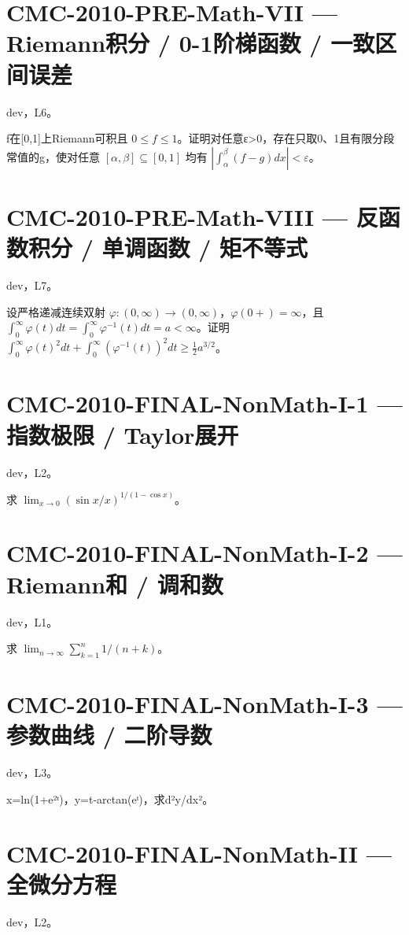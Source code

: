 \documentclass[UTF8]{ctexart}
\begin{document}
\section*{CMC-2010-PRE-Math-VII — Riemann积分 / 0-1阶梯函数 / 一致区间误差}

dev，L6。

f在[0,1]上Riemann可积且 $0\le f\le1$。证明对任意ε>0，存在只取0、1且有限分段常值的g，使对任意 $[\alpha,\beta]\subseteq[0,1]$ 均有 $|\int_\alpha^\beta(f-g)dx|<\varepsilon$。

\section*{CMC-2010-PRE-Math-VIII — 反函数积分 / 单调函数 / 矩不等式}

dev，L7。

设严格递减连续双射 $\varphi:(0,\infty)\to(0,\infty)$，$\varphi(0+)=\infty$，且 $\int_0^\infty\varphi(t)dt=\int_0^\infty\varphi^{-1}(t)dt=a<\infty$。证明 $\int_0^\infty\varphi(t)^2dt+\int_0^\infty(\varphi^{-1}(t))^2dt\ge\tfrac12a^{3/2}$。

\section*{CMC-2010-FINAL-NonMath-I-1 — 指数极限 / Taylor展开}

dev，L2。

求 $\lim_{x\to0}(\sin x/x)^{1/(1-\cos x)}$。

\section*{CMC-2010-FINAL-NonMath-I-2 — Riemann和 / 调和数}

dev，L1。

求 $\lim_{n\to\infty}\sum_{k=1}^n1/(n+k)$。

\section*{CMC-2010-FINAL-NonMath-I-3 — 参数曲线 / 二阶导数}

dev，L3。

x=ln(1+e²ᵗ)，y=t-arctan(eᵗ)，求d²y/dx²。

\section*{CMC-2010-FINAL-NonMath-II — 全微分方程}

dev，L2。
\end{document}

